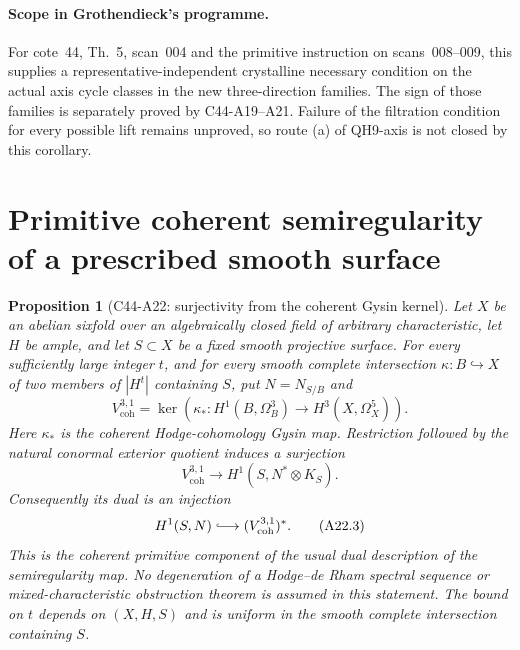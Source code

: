 \documentclass[11pt]{article}
\newtheorem{proposition}[theorem]{Proposition}
\theoremstyle{remark}\newtheorem{remark}[theorem]{Remark}
\begin{document}
\paragraph{Scope in Grothendieck's programme.}
For cote~44, Th.~5, scan~004 and the primitive instruction
on scans~008--009, this supplies a representative-independent
crystalline necessary condition on the actual axis cycle
classes in the new three-direction families. The sign of
those families is separately proved by C44-A19--A21.
Failure of the filtration condition for every possible
lift remains unproved, so route (a) of QH9-axis is not
closed by this corollary.


\section{Primitive coherent semiregularity of a prescribed smooth surface}
\label{sec:c44-a22}

\begin{proposition}[C44-A22: surjectivity from the coherent Gysin kernel]
Let $X$ be an abelian sixfold over an algebraically closed field
of arbitrary characteristic, let $H$ be ample, and let
$S\subset X$ be a fixed smooth projective surface. For every
sufficiently large integer $t$, and for every smooth complete
intersection $\kappa:B\hookrightarrow X$ of two members of
$|H^t|$ containing $S$, put $N=N_{S/B}$ and
\[
 V^{3,1}_{\mathrm{coh}}
  =\ker\left(\kappa_*:
          H^1(B,\Omega_B^3)\longrightarrow H^3(X,\Omega_X^5)\right).
 \tag{A22.1}
\]
Here $\kappa_*$ is the coherent Hodge-cohomology Gysin map.
Restriction followed by the natural conormal exterior quotient
induces a surjection
\[
 V^{3,1}_{\mathrm{coh}}
       \longrightarrow H^1(S,N^*\otimes K_S).
 \tag{A22.2}
\]
Consequently its dual is an injection
\[
 H^1(S,N)\lhook\joinrel\longrightarrow
                     (V^{3,1}_{\mathrm{coh}})^*.
 \tag{A22.3}
\]
This is the coherent primitive component of the usual dual
description of the semiregularity map. No degeneration of a
Hodge--de Rham spectral sequence or mixed-characteristic
obstruction theorem is assumed in this statement.
The bound on $t$ depends on $(X,H,S)$ and is uniform in
the smooth complete intersection containing $S$.
\end{proposition}
\end{document}
